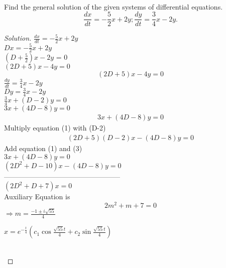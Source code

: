 \documentclass[12pt]{article}
\newenvironment{problem}[2][Problem]{\begin{trivlist}
\item[\hskip \labelsep {\bfseries #1}\hskip \labelsep {\bfseries #2.}]}{\end{trivlist}}
\begin{document}
\begin{problem}{7}
\text{ }\\
Find the general solution of the given systems of differential equations.\\
    $$\frac{dx}{dt} = -\frac{5}{2}x+2y ; \frac{dy}{dt} = \frac{3}{4}x-2y.$$

\end{problem}
\begin{proof}[Solution]

$\frac{dx}{dt} = -\frac{5}{2}x+2y $  \\

$ Dx = -\frac{5}{2} x +2y$  \\

$(D+\frac{5}{2})x - 2y $  = 0 \\

$ (2D +5 )x  - 4y = 0 $  \\
\begin{equation} (2D + 5) x - 4y    = 0   \end{equation} 
 $\frac{dy}{dt} = \frac{3}{4}x-2y$  \\
 
 $ Dy = \frac{3}{4} x - 2y $  \\
 
$ \frac{3}{4} x + (D-2) y = 0 $ \\

$ 3x + (4D - 8)y = 0 $  \\
\begin{align}   3x + (4D - 8)y = 0    \end{align} 
Multiply equation (1) with (D-2) \\

\begin{align} (2D+5)(D-2)x - (4D-8)y  = 0  \end{align} 
Add equation (1) and (3) \\

$3x + (4D - 8)y = 0$ \\
$(2D^2 + D - 10)x - (4D - 8)y = 0$ \\
--------------------------------------------------\\
$(2D^2 + D + 7)x  =  0$ \\

Auxiliary Equation is \\
$$2m^2 + m + 7 = 0 $$ 
$\Rightarrow  m = \frac{-1 \pm i\sqrt{55}}{4} $ \\

\begin{Large} $x = e^{-\frac{t}{4}}(c_1 \cos{\frac{\sqrt{55}t}{4}} + c_2 \sin{\frac{\sqrt{55}t}{4}})$  \end{Large}  \\


\end{proof}
\end{document}
